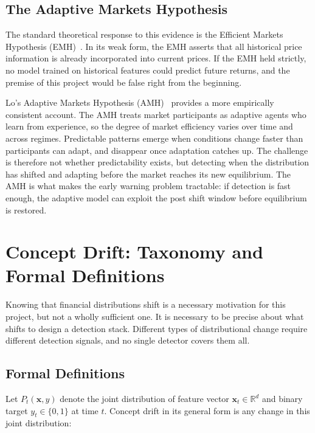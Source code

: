 \subsection{The Adaptive Markets Hypothesis}

The standard theoretical response to this evidence is the Efficient Markets Hypothesis (EMH)~\cite{fama1970}. In its weak form, the EMH asserts that all historical price information is already incorporated into current prices. If the EMH held strictly, no model trained on historical features could predict future returns, and the premise of this project would be false right from the beginning.

Lo's Adaptive Markets Hypothesis (AMH)~\cite{lo2004amh} provides a more empirically consistent account. The AMH treats market participants as adaptive agents who learn from experience, so the degree of market efficiency varies over time and across regimes. Predictable patterns emerge when conditions change faster than participants can adapt, and disappear once adaptation catches up. The challenge is therefore not whether predictability exists, but detecting when the distribution has shifted and adapting before the market reaches its new equilibrium. The AMH is what makes the early warning problem tractable: if detection is fast enough, the adaptive model can exploit the post shift window before equilibrium is restored.

\section{Concept Drift: Taxonomy and Formal Definitions}
\label{sec:drift_taxonomy}

Knowing that financial distributions shift is a necessary motivation for this project, but not a wholly sufficient one. It is necessary to be precise about what shifts to design a detection stack. Different types of distributional change require different detection signals, and no single detector covers them all.

\subsection{Formal Definitions}

Let $P_t(\mathbf{x}, y)$ denote the joint distribution of feature vector $\mathbf{x}_t \in \mathbb{R}^d$ and binary target $y_t \in \{0,1\}$ at time $t$. Concept drift in its general form is any change in this joint distribution:

